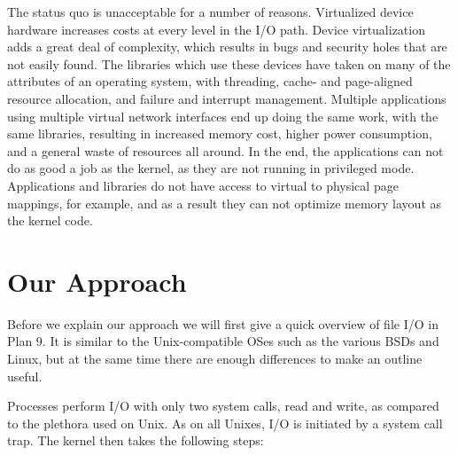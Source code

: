 \documentclass[letterpaper,twocolumn,10pt]{article}
\begin{document}
The status quo is unacceptable for a number of reasons. Virtualized device hardware increases costs at every level in the I/O path. Device
virtualization 
adds a great deal of complexity, which results in bugs and security holes that are not easily found. The libraries which use these 
devices have taken on many of the attributes of an operating system, with threading, cache- and page-aligned resource allocation, 
and failure and interrupt management. Multiple applications using multiple virtual network interfaces end up doing the same work, with the same
libraries, resulting in increased memory cost, higher power consumption, and a general waste of resources all around. In the end, the applications 
can not do as good a job as the kernel, as they are not running in privileged mode. Applications and libraries do not have access to
virtual to physical page mappings, for example, and as a result they can not optimize memory layout as the kernel code. 

\section{Our Approach}
Before we explain our approach we will first give a quick overview of file I/O in Plan 9. It is similar to the Unix-compatible OSes such as the various BSDs and Linux, 
but at the same time there are enough differences to make an outline useful. 

Processes perform I/O with only two system calls, read and write, as compared to the plethora used on Unix. As on all Unixes, I/O is initiated by a system call trap. 
The kernel then takes the following steps:
\end{document}
